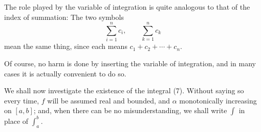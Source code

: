 \documentclass[../poma-notes.tex]{subfiles}
\begin{document}
\begin{definition}
  The role played by the variable of integration is quite analogous to that of the index of summation: The two symbols
  \[
    \sum_{i=1}^{n} c_i, \qquad \sum_{k=1}^{n} c_k
  \]
  mean the same thing, since each means $c_1 + c_2 + \cdots + c_n$.

  Of course, no harm is done by inserting the variable of integration, and in many cases it is actually convenient to do so.

  We shall now investigate the existence of the integral (7). Without saying so every time, $f$ will be assumed real and
  bounded, and $\alpha$ monotonically increasing on $[a,b]$; and, when there can be no misunderstanding, we shall write $\int$
  in place of $\int_a^b$.
\end{definition}

\end{document}
